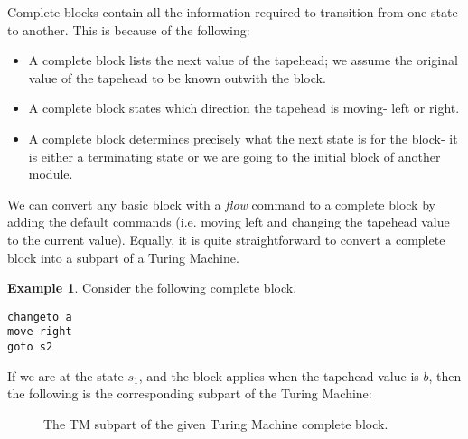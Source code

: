 \documentclass{article}
\theoremstyle{definition}
\newtheorem{example}[theorem]{Example}
\begin{document}
    Complete blocks contain all the information required to transition from one state to another. This is because of the following:
    \begin{itemize}
        \item A complete block lists the next value of the tapehead; we assume the original value of the tapehead to be known outwith the block.
        \item A complete block states which direction the tapehead is moving- left or right.
        \item A complete block determines precisely what the next state is for the block- it is either a terminating state or we are going to the initial block of another module.
    \end{itemize}        
    We can convert any basic block with a \textit{flow} command to a complete block by adding the default commands (i.e. moving left and changing the tapehead value to the current value). Equally, it is quite straightforward to convert a complete block into a subpart of a Turing Machine.
    \begin{example}
        Consider the following complete block.
\begin{lstlisting}[language=TML]
changeto a
move right
goto s2
\end{lstlisting}
        \noindent If we are at the state $s_1$, and the block applies when the tapehead value is $b$, then the following is the corresponding subpart of the Turing Machine:
        \begin{figure}[H]
            \centering
            \caption{The TM subpart of the given Turing Machine complete block.}
        \end{figure}            
    \end{example}
    
\end{document}
